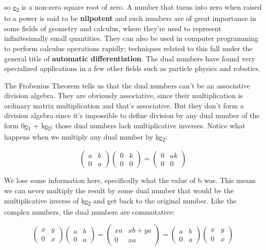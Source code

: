 \documentclass[oneside,english]{amsbook}
\numberwithin{section}{chapter}
\theoremstyle{plain}
\theoremstyle{definition}
\begin{document}
so \ul{e}\textsubscript{2} is a non-zero square root of zero. A number
that turns into zero when raised to a power is said to be
\textbf{nilpotent} and such numbers are of great importance in some
fields of geometry and calculus, where they're used to represent
infinitesimally small quantities. They can also be used in computer
programming to perform calculus operations rapidly; techniques related
to this fall under the general title of \textbf{automatic
	differentiation}. The dual numbers have found very specialized
applications in a few other fields such as particle physics and
robotics.

The Frobenius Theorem tells us that the dual numbers can't be an
associative division algebra. They are obviously associative, since
their multiplication is ordinary matrix multiplication and that's
associative. But they don't form a division algebra since it's
impossible to define division by any dual number of the form
0\ul{e}\textsubscript{1} + k\ul{e}\textsubscript{2}; those dual numbers
lack multiplicative inverses. Notice what happens when we multiply any
dual number by k\ul{e}\textsubscript{2}:

\[\begin{pmatrix}
	a & b \\
	0 & a
\end{pmatrix}\begin{pmatrix}
	0 & k \\
	0 & 0
\end{pmatrix} = \begin{pmatrix}
	0 & ak \\
	0 & 0
\end{pmatrix}\]

We lose some information here, specifically what the value of b was.
This means we can never multiply the result by some dual number that
would be the multiplicative inverse of k\ul{e}\textsubscript{2} and get
back to the original number. Like the complex numbers, the dual numbers
are commutative:

\[\begin{pmatrix}
	x & y \\
	0 & x
\end{pmatrix}\begin{pmatrix}
	a & b \\
	0 & a
\end{pmatrix} = \begin{pmatrix}
	xa & xb + ya \\
	0 & xa
\end{pmatrix} = \begin{pmatrix}
	a & b \\
	0 & a
\end{pmatrix}\begin{pmatrix}
	x & y \\
	0 & x
\end{pmatrix}\]
\end{document}
